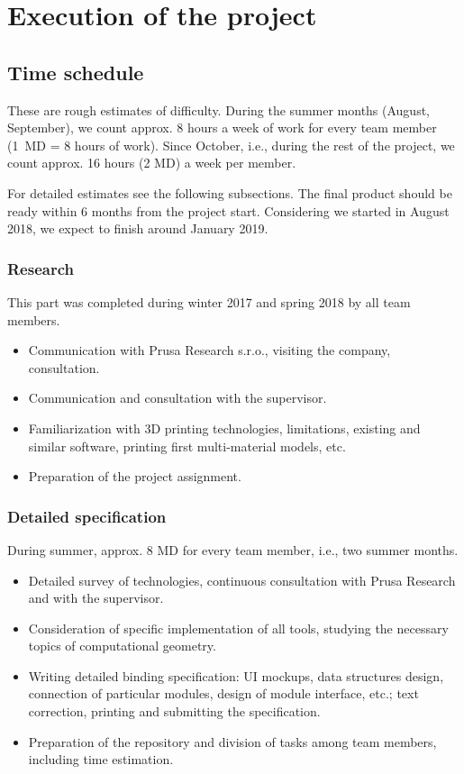 \chapter{Execution of the project}

\section{Time schedule}

These are rough estimates of difficulty.
During the summer months (August, September), we count approx. 8 hours a week of work for every team member (1~MD = 8 hours of work).
Since October, i.e., during the rest of the project, we count approx. 16 hours (2 MD) a week per member.

For detailed estimates see the following subsections.
The final product should be ready within 6 months from the project start.
Considering we started in August 2018, we expect to finish around January 2019.


\subsection{Research}

This part was completed during winter 2017 and spring 2018 by all team members.

\begin{itemize}
\item Communication with Prusa Research s.r.o., visiting the company, consultation.
\item Communication and consultation with the supervisor.
\item Familiarization with 3D printing technologies, limitations, existing and similar software, printing first multi-material models, etc. 
\item Preparation of the project assignment.
\end{itemize}


\subsection{Detailed specification}

During summer, approx. 8 MD for every team member, i.e., two summer months.

\begin{itemize}
\item Detailed survey of technologies, continuous consultation with Prusa Research and with the supervisor.
\item Consideration of specific implementation of all tools, studying the necessary topics of computational geometry.
\item Writing detailed binding specification: UI mockups, data structures design, connection of particular modules, design of module interface, etc.; text correction, printing and submitting the specification.
\item Preparation of the repository and division of tasks among team members, including time estimation.
\end{itemize}



